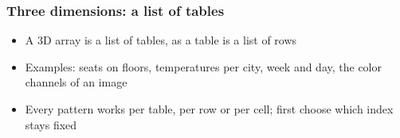 \documentclass[aspectratio=169,10pt,compress]{beamer}
\begin{document}
\begin{frame}[t,fragile] \frametitle{Three dimensions: a list of tables}
	\begin{center}
	\end{center}

	\begin{itemize}\small
		\item A 3D array is a list of tables, as a table is a list of rows
		\item Examples: seats on floors, temperatures per city, week and day, the color channels of an image
		\item Every pattern works per table, per row or per cell; first choose which index stays fixed
	\end{itemize}
\end{frame}
\end{document}
